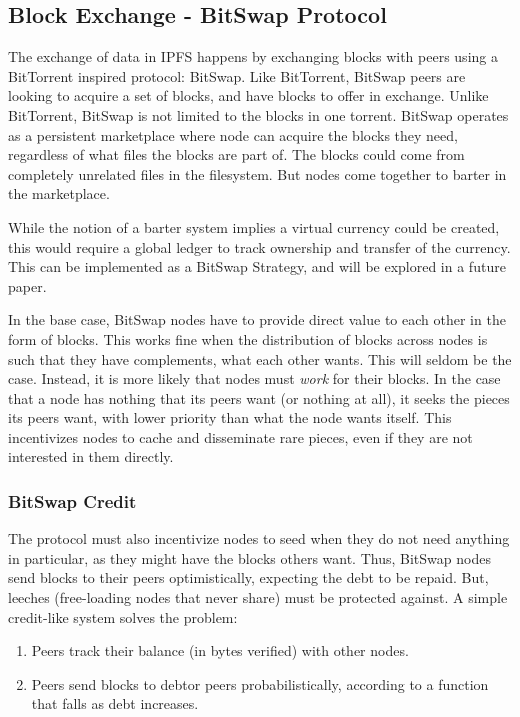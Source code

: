 \documentclass{sig-alternate}
\begin{document}
\subsection{Block Exchange - BitSwap Protocol}

The exchange of data in IPFS happens by exchanging blocks with peers using a
BitTorrent inspired protocol: BitSwap. Like BitTorrent, BitSwap peers are
looking to acquire a set of blocks, and have blocks to offer in exchange.
Unlike BitTorrent, BitSwap is not limited to the blocks in one torrent.
BitSwap operates as a persistent marketplace where node can acquire the
blocks they need, regardless of what files the blocks are part of. The
blocks could come from completely unrelated files in the filesystem.
But nodes come together to barter in the marketplace.

While the notion of a barter system implies a virtual currency could be
created, this would require a global ledger to track ownership
and transfer of the currency. This can be implemented as a BitSwap Strategy, and will be explored in a future paper.

In the base case, BitSwap nodes have to provide direct value to each other
in the form of blocks. This works fine when the distribution of blocks across
nodes is such that they have complements, what each other wants. This will
seldom be the case. Instead, it is more likely that nodes must \textit{work}
for their blocks. In the case that a node has nothing that its peers want (or
nothing at all), it seeks the pieces its peers want, with lower
priority than what the node wants itself. This incentivizes nodes to cache and
disseminate rare pieces, even if they are not interested in them directly.

\subsubsection{BitSwap Credit}

The protocol must also incentivize nodes to seed when they do not need
anything in particular, as they might have the blocks others want. Thus,
BitSwap nodes send blocks to their peers optimistically, expecting the debt to
be repaid. But, leeches (free-loading nodes that never share) must be protected against. A simple credit-like system solves the problem:

\begin{enumerate}
  \item Peers track their balance (in bytes verified) with other nodes.
  \item Peers send blocks to debtor peers probabilistically, according to
        a function that falls as debt increases.
\end{enumerate}
\end{document}
